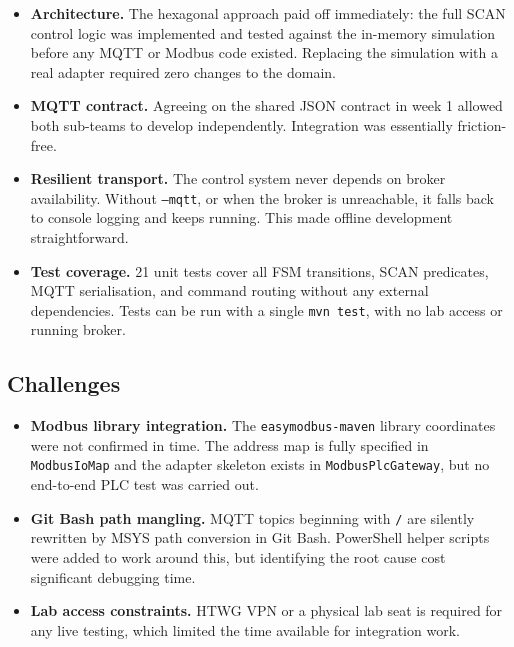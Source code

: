 \documentclass[12pt,a4paper]{article}
\begin{document}
\begin{itemize}
    \item \textbf{Architecture.}
          The hexagonal approach paid off immediately: the full SCAN control logic
          was implemented and tested against the in-memory simulation before any
          MQTT or Modbus code existed. Replacing the simulation with a real adapter
          required zero changes to the domain.

    \item \textbf{MQTT contract.}
          Agreeing on the shared JSON contract in week 1 allowed both sub-teams to
          develop independently. Integration was essentially friction-free.

    \item \textbf{Resilient transport.}
          The control system never depends on broker availability. Without
          \texttt{--mqtt}, or when the broker is unreachable, it falls back to
          console logging and keeps running. This made offline development
          straightforward.

    \item \textbf{Test coverage.}
          21 unit tests cover all FSM transitions, SCAN predicates, MQTT
          serialisation, and command routing without any external dependencies.
          Tests can be run with a single \texttt{mvn test}, with no lab access
          or running broker.
\end{itemize}

\subsection{Challenges}

\begin{itemize}
    \item \textbf{Modbus library integration.}
          The \texttt{easymodbus-maven} library coordinates were not confirmed
          in time. The address map is fully specified in \texttt{ModbusIoMap}
          and the adapter skeleton exists in \texttt{ModbusPlcGateway}, but no
          end-to-end PLC test was carried out.

    \item \textbf{Git Bash path mangling.}
          MQTT topics beginning with \texttt{/} are silently rewritten by MSYS
          path conversion in Git Bash. PowerShell helper scripts were added to
          work around this, but identifying the root cause cost significant
          debugging time.

    \item \textbf{Lab access constraints.}
          HTWG VPN or a physical lab seat is required for any live testing,
          which limited the time available for integration work.
\end{itemize}
\end{document}
